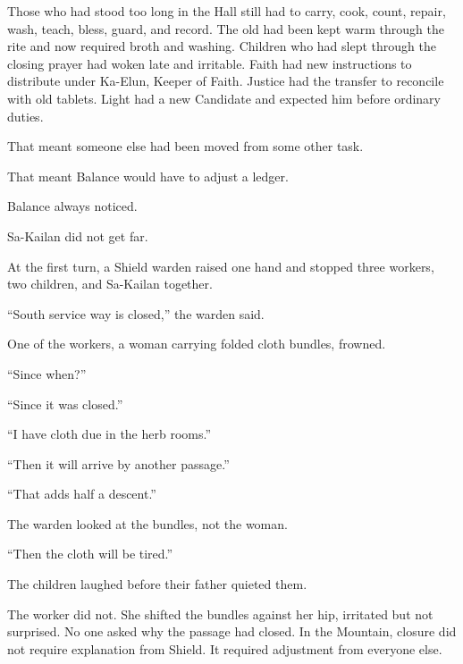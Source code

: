 Those who had stood too long in the Hall still had to carry, cook, count, repair, wash, teach, bless, guard, and record.
The old had been kept warm through the rite and now required broth and washing.
Children who had slept through the closing prayer had woken late and irritable.
Faith had new instructions to distribute under Ka-Elun, Keeper of Faith.
Justice had the transfer to reconcile with old tablets.
Light had a new Candidate and expected him before ordinary duties.\par

That meant someone else had been moved from some other task.\par

That meant Balance would have to adjust a ledger.\par

Balance always noticed.\par

Sa-Kailan did not get far.\par

At the first turn, a Shield warden raised one hand and stopped three workers, two children, and Sa-Kailan together.\par

“South service way is closed,” the warden said.\par

One of the workers, a woman carrying folded cloth bundles, frowned.\par

“Since when?”\par

“Since it was closed.”\par

“I have cloth due in the herb rooms.”\par

“Then it will arrive by another passage.”\par

“That adds half a descent.”\par

The warden looked at the bundles, not the woman.\par

“Then the cloth will be tired.”\par

The children laughed before their father quieted them.\par

The worker did not.
She shifted the bundles against her hip, irritated but not surprised.
No one asked why the passage had closed.
In the Mountain, closure did not require explanation from Shield.
It required adjustment from everyone else.\par

